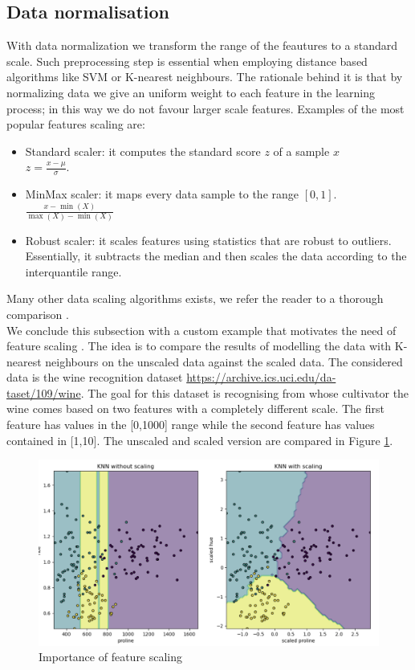 \subsection{Data normalisation}\label{appendix:normalization}
With data normalization we transform the range of the feautures to a standard scale.
Such preprocessing step is essential when employing distance based algorithms like SVM or K-nearest neighbours. The rationale behind it is that by normalizing data we give an uniform weight to each feature in the learning process; in this way we do not favour larger scale features.
Examples of the most popular features scaling are:
\begin{itemize}
    \item Standard scaler: it computes the standard score $z$ of a sample $x$
    \\
    $z=\frac{x-\mu}{\sigma}$.
    \item MinMax scaler: it maps every data sample to the range $[0,1]$.
    \\
    $\frac{x-\min(X)}{\max(X)-\min(X)}$
    \item Robust scaler: it scales features using statistics that are robust to outliers.
    Essentially, it subtracts the median and then scales the data according to the interquantile range.
\end{itemize}
Many other data scaling algorithms exists, we refer the reader to a thorough comparison .
\\
We conclude this subsection with a custom example that motivates the need of feature scaling . The idea is to compare the results of modelling the data with K-nearest neighbours on the unscaled data against the scaled data. The considered data is the wine recognition dataset \href{https://archive.ics.uci.edu/dataset/109/wine}{https://archive.ics.uci.edu/da-taset/109/wine}. The goal for this dataset is recognising from whose cultivator the wine comes based on two features with a completely different scale. The first feature has values in the [0,1000] range while the second feature has values contained in [1,10].
The unscaled and scaled version are compared in Figure \ref{fig:feature_scaler_example}.
\begin{figure}[!h]
    \includegraphics[width=\textwidth]{images/feature_scaler_example.png}
    \caption[Importance of feature scaling]{Importance of feature scaling }
    \label{fig:feature_scaler_example}
\end{figure}
